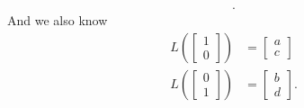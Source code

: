 \documentclass{report}
\begin{document}
\begin{itemize}
\begin{align*}
        .\end{align*} 
        \bigbreak \noindent 
        And  we also know
        \begin{align*}
            L\left( \begin{bmatrix}1 \\0 \end{bmatrix}\right)  &= \begin{bmatrix} a \\ c\end{bmatrix} \\
            L\left( \begin{bmatrix}0 \\1 \end{bmatrix}\right)  &= \begin{bmatrix} b \\ d\end{bmatrix} 
        .\end{align*}


\end{itemize}
\end{document}
